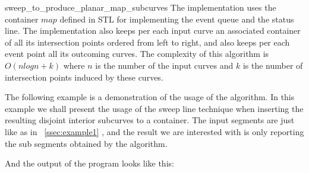 \begin{ccRefFunction}{sweep_to_produce_planar_map_subcurves}
\ccImplementation 
The implementation uses the container $map$ defined in STL for implementing 
the event queue and the status line.
The implementation also keeps per each input curve an associated container of all 
its intersection points ordered from left to right, and also keeps per each event point all 
its outcoming curves.   
The complexity of this algorithm is $O(nlogn + k)$ where $n$ is the number of the input curves 
and $k$ is the number of intersection points induced by these curves.


\label{ssec:example2}
The following example is a demonstration of the usage of the  algorithm. 
In this example we shall present the usage of the sweep line technique 
when inserting the resulting disjoint interior subcurves to a container. 
The input segments are just like as in ~\ref{ssec:example1} , 
and the result we are interested with is only reporting the sub segments 
obtained by the  algorithm.


And the output of the program looks like this:


\end{ccRefFunction} %

\ccRefPageEnd











